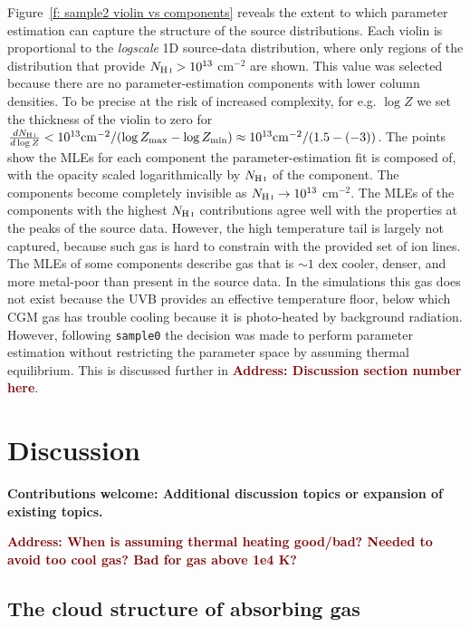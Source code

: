 \documentclass[fleqn,usenatbib]{mnras}
\newcommand{\thoughts}[1]{\textcolor{BurntOrange}{\textbf{Contributions welcome: #1}}}
\newcommand{\todo}[1]{\textcolor{Maroon}{\textbf{Address: #1}}}
\begin{document}
Figure~\ref{f: sample2 violin vs components} reveals the extent to which parameter estimation can capture the structure of the source distributions.
Each violin is proportional to the \textit{logscale} 1D source-data distribution,
where only regions of the distribution that provide $N_{\ion{H}{I}} > 10^{13}$ cm$^{-2}$ are shown.
This value was selected because there are no parameter-estimation components with lower column densities.
To be precise at the risk of increased complexity,
for e.g. $\log Z$ we set the thickness of the violin to zero for $\frac{dN_{\ion{H}{I}}}{d\log Z} < 10^{13} {\rm cm}^{-2} / (\log Z_{\rm max} - \log Z_{\rm min} ) \approx 10^{13} {\rm cm}^{-2} / ( 1.5 - (-3) )$.
The points show the MLEs for each component the parameter-estimation fit is composed of,
with the opacity scaled logarithmically by $N_{\ion{H}{I}}$ of the component.
The components become completely invisible as $N_{\ion{H}{I}} \rightarrow 10^{13}$ cm$^{-2}$.
The MLEs of the components with the highest $N_{\ion{H}{I}}$ contributions agree well with the properties at the peaks of the source data.
However, the high temperature tail is largely not captured, because such gas is hard to constrain with the provided set of ion lines.
The MLEs of some components describe gas that is $\sim 1$ dex cooler, denser, and more metal-poor than present in the source data.
In the simulations this gas does not exist because the UVB provides an effective temperature floor,
below which CGM gas has trouble cooling because it is photo-heated by background radiation.
However, following \texttt{sample0} the decision was made to perform parameter estimation without restricting the parameter space by assuming thermal equilibrium.
This is discussed further in \todo{Discussion section number here}.

\section{Discussion}
\label{s: discussion}

\thoughts{Additional discussion topics or expansion of existing topics.}

\todo{When is assuming thermal heating good/bad?
Needed to avoid too cool gas?
Bad for gas above 1e4 K?
}

\subsection{The cloud structure of absorbing gas}
\end{document}
